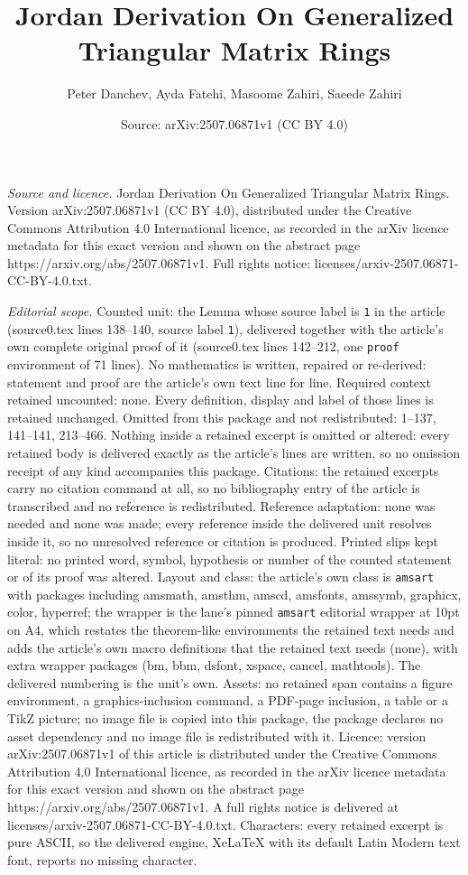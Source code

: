 \documentclass[10pt,a4paper]{amsart}
\title[Jordan Derivation On Generalized Triangular Matrix Rings]{Jordan Derivation On Generalized Triangular Matrix Rings}
\author{Peter Danchev, Ayda Fatehi, Masoome Zahiri, Saeede Zahiri}
\date{Source: arXiv:2507.06871v1 (CC BY 4.0)}
\begin{document}
\maketitle

\noindent\emph{Source and licence.} Jordan Derivation On Generalized Triangular Matrix Rings. Version arXiv:2507.06871v1 (CC BY 4.0), distributed under the Creative Commons Attribution 4.0 International licence, as recorded in the arXiv licence metadata for this exact version and shown on the abstract page https://arxiv.org/abs/2507.06871v1. Full rights notice: licenses/arxiv-2507.06871-CC-BY-4.0.txt.\par\smallskip

\noindent\textit{Editorial scope.} Counted unit: the Lemma whose source label is \texttt{1} in the article (source0.tex lines 138--140, source label \texttt{1}), delivered together with the article's own complete original proof of it (source0.tex lines 142--212, one \texttt{proof} environment of 71 lines). No mathematics is written, repaired or re-derived: statement and proof are the article's own text line for line. Required context retained uncounted: none. Every definition, display and label of those lines is retained unchanged. Omitted from this package and not redistributed: 1--137, 141--141, 213--466. Nothing inside a retained excerpt is omitted or altered: every retained body is delivered exactly as the article's lines are written, so no omission receipt of any kind accompanies this package. Citations: the retained excerpts carry no citation command at all, so no bibliography entry of the article is transcribed and no reference is redistributed. Reference adaptation: none was needed and none was made; every reference inside the delivered unit resolves inside it, so no unresolved reference or citation is produced. Printed slips kept literal: no printed word, symbol, hypothesis or number of the counted statement or of its proof was altered. Layout and class: the article's own class is \texttt{amsart} with packages including amsmath, amsthm, amscd, amsfonts, amssymb, graphicx, color, hyperref; the wrapper is the lane's pinned \texttt{amsart} editorial wrapper at 10pt on A4, which restates the theorem-like environments the retained text needs and adds the article's own macro definitions that the retained text needs (none), with extra wrapper packages (bm, bbm, dsfont, xspace, cancel, mathtools). The delivered numbering is the unit's own. Assets: no retained span contains a figure environment, a graphics-inclusion command, a PDF-page inclusion, a table or a TikZ picture; no image file is copied into this package, the package declares no asset dependency and no image file is redistributed with it. Licence: version arXiv:2507.06871v1 of this article is distributed under the Creative Commons Attribution 4.0 International licence, as recorded in the arXiv licence metadata for this exact version and shown on the abstract page https://arxiv.org/abs/2507.06871v1. A full rights notice is delivered at licenses/arxiv-2507.06871-CC-BY-4.0.txt. Characters: every retained excerpt is pure ASCII, so the delivered engine, XeLaTeX with its default Latin Modern text font, reports no missing character.
\end{document}
